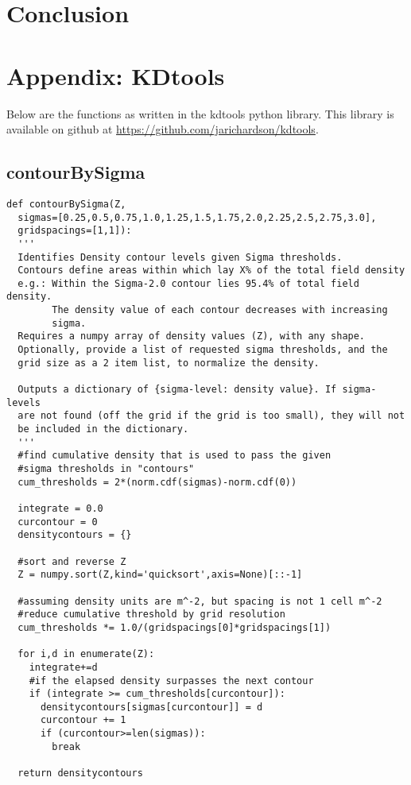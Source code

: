 \documentclass[12pt,letter]{article}
\begin{document}
\section{Conclusion}

\section{Appendix: KDtools}
\label{sec_kdtoolscode}
Below are the functions as written in the kdtools python library. This library is available on github at \url{https://github.com/jarichardson/kdtools}.

\subsection{contourBySigma}
\begin{verbatim}
def contourBySigma(Z, 
  sigmas=[0.25,0.5,0.75,1.0,1.25,1.5,1.75,2.0,2.25,2.5,2.75,3.0],
  gridspacings=[1,1]):
  '''
  Identifies Density contour levels given Sigma thresholds.
  Contours define areas within which lay X% of the total field density
  e.g.: Within the Sigma-2.0 contour lies 95.4% of total field density.
        The density value of each contour decreases with increasing
        sigma.
  Requires a numpy array of density values (Z), with any shape.
  Optionally, provide a list of requested sigma thresholds, and the
  grid size as a 2 item list, to normalize the density.
  
  Outputs a dictionary of {sigma-level: density value}. If sigma-levels
  are not found (off the grid if the grid is too small), they will not
  be included in the dictionary.
  '''
  #find cumulative density that is used to pass the given
  #sigma thresholds in "contours"
  cum_thresholds = 2*(norm.cdf(sigmas)-norm.cdf(0))
  
  integrate = 0.0
  curcontour = 0
  densitycontours = {}
  
  #sort and reverse Z
  Z = numpy.sort(Z,kind='quicksort',axis=None)[::-1]
  
  #assuming density units are m^-2, but spacing is not 1 cell m^-2
  #reduce cumulative threshold by grid resolution
  cum_thresholds *= 1.0/(gridspacings[0]*gridspacings[1])
  
  for i,d in enumerate(Z):
    integrate+=d
    #if the elapsed density surpasses the next contour
    if (integrate >= cum_thresholds[curcontour]):
      densitycontours[sigmas[curcontour]] = d
      curcontour += 1
      if (curcontour>=len(sigmas)):
        break
  
  return densitycontours
\end{verbatim}
\end{document}
